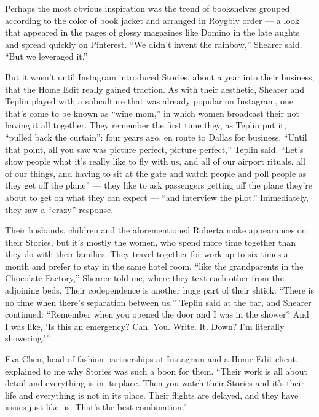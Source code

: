Perhaps the most obvious inspiration was the trend of bookshelves
grouped according to the color of book jacket and arranged in Roygbiv
order --- a look that appeared in the pages of glossy magazines like
Domino in the late aughts and spread quickly on Pinterest. ``We didn't
invent the rainbow,'' Shearer said. ``But we leveraged it.''

But it wasn't until Instagram introduced Stories, about a year into
their business, that the Home Edit really gained traction. As with their
aesthetic, Shearer and Teplin played with a subculture that was already
popular on Instagram, one that's come to be known as ``wine mom,'' in
which women broadcast their not having it all together. They remember
the first time they, as Teplin put it, ``pulled back the curtain'': four
years ago, en route to Dallas for business. ``Until that point, all you
saw was picture perfect, picture perfect,'' Teplin said. ``Let's show
people what it's really like to fly with us, and all of our airport
rituals, all of our things, and having to sit at the gate and watch
people and poll people as they get off the plane'' --- they like to ask
passengers getting off the plane they're about to get on what they can
expect --- ``and interview the pilot.'' Immediately, they saw a
``crazy'' response.

Their husbands, children and the aforementioned Roberta make appearances
on their Stories, but it's mostly the women, who spend more time
together than they do with their families. They travel together for work
up to six times a month and prefer to stay in the same hotel room,
``like the grandparents in the Chocolate Factory,'' Shearer told me,
where they text each other from the adjoining beds. Their codependence
is another huge part of their shtick. ``There is no time when there's
separation between us,'' Teplin said at the bar, and Shearer continued:
``Remember when you opened the door and I was in the shower? And I was
like, `Is this an emergency? Can. You. Write. It. Down? I'm literally
showering.'''

Eva Chen, head of fashion partnerships at Instagram and a Home Edit
client, explained to me why Stories was such a boon for them. ``Their
work is all about detail and everything is in its place. Then you watch
their Stories and it's their life and everything is not in its place.
Their flights are delayed, and they have issues just like us. That's the
best combination.''

